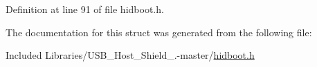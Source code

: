 \-Definition at line 91 of file hidboot.\-h.



\-The documentation for this struct was generated from the following file\-:\begin{DoxyCompactItemize}
\item 
\-Included Libraries/\-U\-S\-B\-\_\-\-Host\-\_\-\-Shield\-\_.-\/master/\hyperlink{hidboot_8h}{hidboot.\-h}\end{DoxyCompactItemize}
